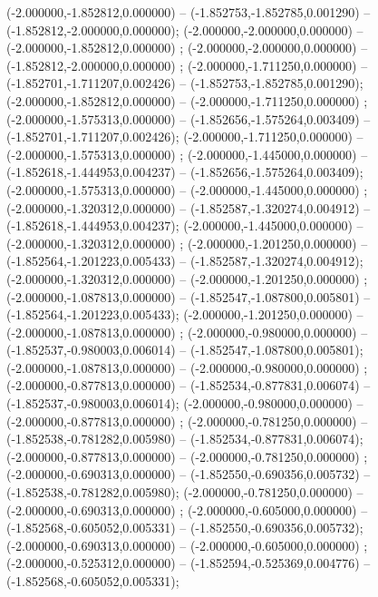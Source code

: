 (-2.000000,-1.852812,0.000000) -- (-1.852753,-1.852785,0.001290) -- (-1.852812,-2.000000,0.000000);
 (-2.000000,-2.000000,0.000000) -- (-2.000000,-1.852812,0.000000) ;
 (-2.000000,-2.000000,0.000000) -- (-1.852812,-2.000000,0.000000) ;
 (-2.000000,-1.711250,0.000000) -- (-1.852701,-1.711207,0.002426) -- (-1.852753,-1.852785,0.001290);
 (-2.000000,-1.852812,0.000000) -- (-2.000000,-1.711250,0.000000) ;
 (-2.000000,-1.575313,0.000000) -- (-1.852656,-1.575264,0.003409) -- (-1.852701,-1.711207,0.002426);
 (-2.000000,-1.711250,0.000000) -- (-2.000000,-1.575313,0.000000) ;
 (-2.000000,-1.445000,0.000000) -- (-1.852618,-1.444953,0.004237) -- (-1.852656,-1.575264,0.003409);
 (-2.000000,-1.575313,0.000000) -- (-2.000000,-1.445000,0.000000) ;
 (-2.000000,-1.320312,0.000000) -- (-1.852587,-1.320274,0.004912) -- (-1.852618,-1.444953,0.004237);
 (-2.000000,-1.445000,0.000000) -- (-2.000000,-1.320312,0.000000) ;
 (-2.000000,-1.201250,0.000000) -- (-1.852564,-1.201223,0.005433) -- (-1.852587,-1.320274,0.004912);
 (-2.000000,-1.320312,0.000000) -- (-2.000000,-1.201250,0.000000) ;
 (-2.000000,-1.087813,0.000000) -- (-1.852547,-1.087800,0.005801) -- (-1.852564,-1.201223,0.005433);
 (-2.000000,-1.201250,0.000000) -- (-2.000000,-1.087813,0.000000) ;
 (-2.000000,-0.980000,0.000000) -- (-1.852537,-0.980003,0.006014) -- (-1.852547,-1.087800,0.005801);
 (-2.000000,-1.087813,0.000000) -- (-2.000000,-0.980000,0.000000) ;
 (-2.000000,-0.877813,0.000000) -- (-1.852534,-0.877831,0.006074) -- (-1.852537,-0.980003,0.006014);
 (-2.000000,-0.980000,0.000000) -- (-2.000000,-0.877813,0.000000) ;
 (-2.000000,-0.781250,0.000000) -- (-1.852538,-0.781282,0.005980) -- (-1.852534,-0.877831,0.006074);
 (-2.000000,-0.877813,0.000000) -- (-2.000000,-0.781250,0.000000) ;
 (-2.000000,-0.690313,0.000000) -- (-1.852550,-0.690356,0.005732) -- (-1.852538,-0.781282,0.005980);
 (-2.000000,-0.781250,0.000000) -- (-2.000000,-0.690313,0.000000) ;
 (-2.000000,-0.605000,0.000000) -- (-1.852568,-0.605052,0.005331) -- (-1.852550,-0.690356,0.005732);
 (-2.000000,-0.690313,0.000000) -- (-2.000000,-0.605000,0.000000) ;
 (-2.000000,-0.525312,0.000000) -- (-1.852594,-0.525369,0.004776) -- (-1.852568,-0.605052,0.005331);
